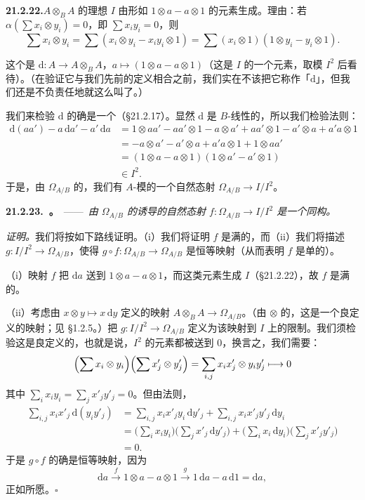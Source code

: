 \textbf{21.2.22.}\quad $A\otimes_BA$ 的理想 $I$ 由形如 $1\otimes a-a\otimes 1$ 的元素生成。理由：若 $\alpha(\sum x_i\otimes y_i)=0$，即 $\sum x_iy_i=0$，则
\[
\sum x_i\otimes y_i=\sum(x_i\otimes y_i-x_iy_i\otimes 1)=\sum(x_i\otimes 1)(1\otimes y_i-y_i\otimes 1).
\]

这个\trDerivation{}是 $\mathrm{d}\colon A\to A\otimes_BA$，$a\mapsto(1\otimes a-a\otimes 1)$（这是 $I$ 的一个元素，取模 $I^2$ 后看待）。（在验证它与我们先前的定义相合之前，我们实在不该把它称作「$\mathrm{d}$」，但我们还是不负责任地就这么叫了。）

我们来检验 $\mathrm{d}$ 的确是一个\trDerivation（\S21.2.17）。显然 $\mathrm{d}$ 是 $B$-线性的，所以我们检验\trLeibniz{}法则：
\begin{align*}
\mathrm{d}(aa')-a\,\mathrm{d}a'-a'\,\mathrm{d}a &= 1\otimes aa'-aa'\otimes 1-a\otimes a'+aa'\otimes 1-a'\otimes a+a'a\otimes 1\\
&= -a\otimes a'-a'\otimes a+a'a\otimes 1+1\otimes aa'\\
&= (1\otimes a-a\otimes 1)(1\otimes a'-a'\otimes 1)\\
&\in I^2.
\end{align*}
于是，由 $\Omega_{A/B}$ 的\trUniversalProperty，我们有 $A$-模的一个自然态射 $\Omega_{A/B}\to I/I^2$。

\textbf{21.2.23.\ \trhTheorem。}\ ——\ \emph{由 $\Omega_{A/B}$ 的\trUniversalProperty{}诱导的自然态射 $f\colon\Omega_{A/B}\to I/I^2$ 是一个同构。}

\emph{证明。}\quad 我们将按如下路线证明。（i）我们将证明 $f$ 是满的，而（ii）我们将描述 $g\colon I/I^2\to\Omega_{A/B}$，使得 $g\circ f\colon\Omega_{A/B}\to\Omega_{A/B}$ 是恒等映射（从而表明 $f$ 是单的）。

（i）映射 $f$ 把 $\mathrm{d}a$ 送到 $1\otimes a-a\otimes 1$，而这类元素生成 $I$（\S21.2.22），故 $f$ 是满的。

（ii）考虑由 $x\otimes y\mapsto x\,\mathrm{d}y$ 定义的映射 $A\otimes_BA\to\Omega_{A/B}$。（由 $\otimes$ 的\trUniversalProperty，这是一个良定义的映射；见 \S1.2.5。）把 $g\colon I/I^2\to\Omega_{A/B}$ 定义为该映射到 $I$ 上的限制。我们须检验这是良定义的，也就是说，$I^2$ 的元素都被送到 $0$，换言之，我们需要：
\[
\Bigl(\sum x_i\otimes y_i\Bigr)\Bigl(\sum x'_j\otimes y'_j\Bigr)=\sum_{i,j}x_ix'_j\otimes y_iy'_j\longmapsto 0
\]
其中 $\sum_i x_iy_i=\sum_j x'_jy'_j=0$。但由\trLeibniz{}法则，
\begin{align*}
\sum_{i,j}x_ix'_j\,\mathrm{d}(y_iy'_j) &= \sum_{i,j}x_ix'_jy_i\,\mathrm{d}y'_j+\sum_{i,j}x_ix'_jy'_j\,\mathrm{d}y_i\\
&= \biggl(\sum_i x_iy_i\biggr)\biggl(\sum_j x'_j\,\mathrm{d}y'_j\biggr)+\biggl(\sum_i x_i\,\mathrm{d}y_i\biggr)\biggl(\sum_j x'_jy'_j\biggr)\\
&= 0.
\end{align*}
于是 $g\circ f$ 的确是恒等映射，因为
\[
\mathrm{d}a\xrightarrow{\ f\ }1\otimes a-a\otimes 1\xrightarrow{\ g\ }1\,\mathrm{d}a-a\,\mathrm{d}1=\mathrm{d}a,
\]
正如所愿。\hfill$\square$

